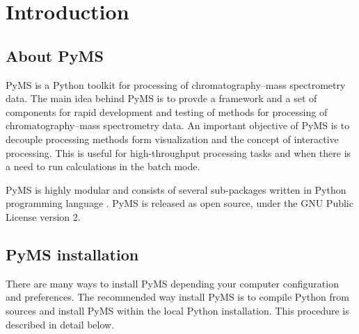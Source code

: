 

\chapter{Introduction}

\section{About PyMS}

PyMS is a Python toolkit for processing of chromatography--mass spectrometry
data. The main idea behind PyMS is to provde a framework and a set of
components for rapid development and testing of methods for processing of
chromatography--mass spectrometry data. An important objective of PyMS is
to decouple processing methods form visualization and the concept of
interactive processing. This is useful for high-throughput processing tasks
and when there is a need to run calculations in the batch mode.

PyMS is highly modular and consists of several sub-packages written in Python
programming language \cite{python}. PyMS is released as open source, under
the GNU Public License version 2.

\section{PyMS installation}

There are many ways to install PyMS depending your computer configuration
and preferences. The recommended way install PyMS is to compile Python
from sources and install PyMS within the local Python installation. This
procedure is described in detail below.

